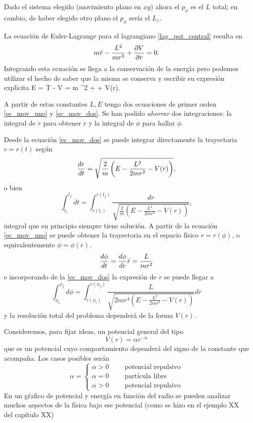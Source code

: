 \documentclass[10pt,oneside]{CBFT_book}
\begin{document}
Dado el sistema elegido (movimiento plano en $xy$) ahora el $p_\phi$ es el $L$ total; en cambio, de haber elegido otro 
plano el $p_\phi$ sería el $L_z$.

La ecuación de Euler-Lagrange para el lagrangiano \eqref{lag_pot_central} resulta en
\[
	m\ddot{r} - \frac{L^2}{mr^3} + \frac{\partial^{\hspace{-0.05em}} {V}}{\partial {r}^{\hspace{-0.05em}}} = 0.
\]
Integrando esta ecuación se llega a la conservación de la energía pero podemos utilizar el hecho de saber que la 
misma se conserva y escribir su expresión explícita
\be
	E = T - V = m ^2 +  + V(r).
	\label{ec_mov_dos}
\ee

A partir de estas constantes $L,E$ tengo dos ecuaciones de primer orden \eqref{ec_mov_uno} y \eqref{ec_mov_dos}. Se han 
podido {\it ahorrar} dos integraciones: la integral de $\ddot{r}$ para obtener $\dot{r}$ y la integral de $\ddot{\phi}$ 
para hallar $\dot{\phi}$.

Desde la ecuación \eqref{ec_mov_dos} se puede integrar directamente la trayectoria $r=r(t)$ según
\[
	\frac{d^{\hspace{-0.05em}} {r}}{d {t}^{\hspace{-0.05em}}} = \sqrt{ \frac{2}{m}\left( E - \frac{L^2}{2 m r^2} - V(r) \right)},
\]
o bien 
\[
	\int_{t_i}^{t_f} dt = \int_{r(t_i)}^{r(t_f)} \frac{dr}{\sqrt{\frac 2 m ( E - \frac{L^2}{2 m r^2} - V(r) )}},
\]
integral que en principio siempre tiene solución.
A partir de la ecuación \eqref{ec_mov_uno} se puede obtener la trayectoria en el espacio físico $r=r(\phi)$, o 
equivalentemente $\phi=\phi(r)$.
\[
	\frac{d^{\hspace{-0.05em}} {\phi}}{d {t}^{\hspace{-0.05em}}} = \frac{d^{\hspace{-0.05em}} {\phi}}{d {r}^{\hspace{-0.05em}}} \dot{r} =  \frac{L}{mr^2} 
\]
e incorporando de la \eqref{ec_mov_dos} la expresión de $\dot{r}$ se puede llegar a 
\[
	\int_{\phi_i}^{\phi_f} d\phi = \int_{r(\phi_i)}^{r(\phi_f)} 
	\frac{L}{\sqrt{ 2 m r^4 \left( E - \frac{L^2}{2 m r^2} - V(r) \right)}}dr
\]
y la resolución total del problema dependerá de la forma $V(r)$.

Consideremos, para fijar ideas, un potencial general del tipo 
\[
	V(r)  = \alpha r^{-n} 
\]
que es un potencial cuyo comportamiento dependerá del signo de la constante que acompaña. Los casos posibles serán 
\[
	\alpha = \begin{cases}
	\alpha > 0 \qquad \text{ potencial repulsivo} \\
	\alpha = 0 \qquad \text{ partícula libre} \\
	\alpha > 0 \qquad \text{ potencial repulsivo} 
	\end{cases}
\]
En un gŕafico de potencial y energía en función del radio se pueden analizar muchos aspectos de la física bajo ese 
potencial (como se hizo en el ejemplo XX del capítulo XX)
\end{document}
